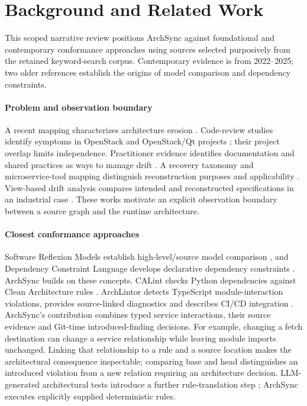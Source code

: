 \section{Background and Related Work}
This scoped narrative review positions ArchSync against foundational and contemporary conformance approaches using sources selected purposively from the retained keyword-search corpus. Contemporary evidence is from 2022--2025; two older references establish the origins of model comparison and dependency constraints.

\paragraph{Problem and observation boundary} A recent mapping characterizes architecture erosion \cite{li2022erosion}. Code-review studies identify symptoms in OpenStack and OpenStack/Qt projects \cite{li2022symptoms,li2023warnings}; their project overlap limits independence. Practitioner evidence identifies documentation and shared practices as ways to manage drift \cite{anthony2024drifting}. A recovery taxonomy and microservice-tool mapping distinguish reconstruction purposes and applicability \cite{sar2024taxonomy,bakhtin2024mapping}. View-based drift analysis compares intended and reconstructed specifications in an industrial case \cite{uzun2024drift}. These works motivate an explicit observation boundary between a source graph and the runtime architecture.

\paragraph{Closest conformance approaches} Software Reflexion Models establish high-level/source model comparison \cite{murphy1995reflexion}, and Dependency Constraint Language develops declarative dependency constraints \cite{terra2009dcl}. ArchSync builds on these concepts. CALint checks Python dependencies against Clean Architecture rules \cite{calint2022}. ArchLintor detects TypeScript module-interaction violations, provides source-linked diagnostics and describes CI/CD integration \cite{archlintor2025}. ArchSync's contribution combines typed service interactions, their source evidence and Git-time introduced-finding decisions. For example, changing a fetch destination can change a service relationship while leaving module imports unchanged. Linking that relationship to a rule and a source location makes the architectural consequence inspectable; comparing base and head distinguishes an introduced violation from a new relation requiring an architecture decision. LLM-generated architectural tests introduce a further rule-translation step \cite{lucena2025gatekeepers}; ArchSync executes explicitly supplied deterministic rules.

